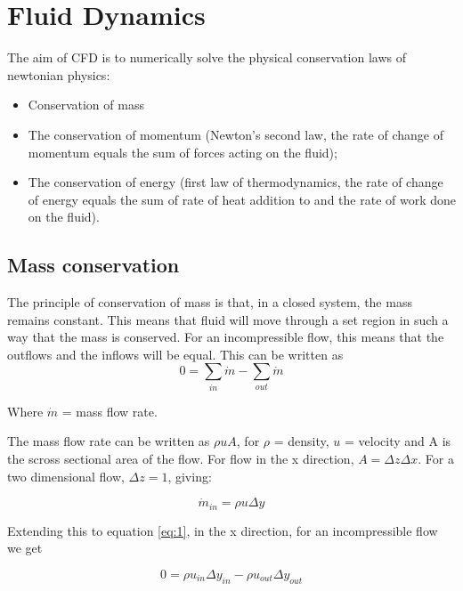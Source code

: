 \section{Fluid Dynamics}
The aim of CFD is to numerically solve the physical conservation laws of newtonian physics:

\begin{itemize}
  \item Conservation of mass

  \item The conservation of momentum (Newton’s second law, the rate of change of momentum equals the sum of forces acting on the fluid);

  \item The conservation of energy (first law of thermodynamics, the rate of change of energy equals the sum of rate of heat addition to and the rate of work done on the fluid).
 
\end{itemize}

    \subsection{Mass conservation}

    The principle of conservation of mass is that, in a closed system, the mass remains constant. This means that fluid will move through a set region in such a way that the mass is conserved. For an incompressible flow, this means that the outflows and the inflows will be equal. This can be written as
    \begin{equation} \label{eq:1}
      0 = \sum_{in} \dot{m} - \sum_{out} \dot{m}
    \end{equation} 

    Where $\dot{m}$ = mass flow rate.
    
    The mass flow rate can be written as $ \rho u A $,  for $\rho$ = density, $u$ = velocity and A is the scross sectional area of the flow. For flow in the x direction, $ A = \Delta z \Delta x $. For a two dimensional flow, $ \Delta z = 1 $, giving:

    \begin{equation} \label{eq:2}
      \dot{m}_{in} = \rho u \Delta y
     \end{equation}

    Extending this to equation \ref{eq:1}, in the x direction, for an incompressible flow we get

    \begin{equation} \label{eq:3}
      0 = \rho u_{in} \Delta y_{in} - \rho u_{out} \Delta y_{out}
    \end{equation}

